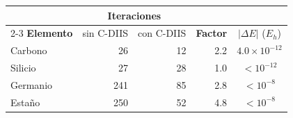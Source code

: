 \begin{tabular}{lrrrc}
    \toprule
     & \multicolumn{2}{c}{\textbf{Iteraciones}} &  &  \\
    \cmidrule(lr){2-3}
    \textbf{Elemento} & sin C-DIIS & con C-DIIS & \textbf{Factor} & $|\Delta E|$ ($E_h$) \\
    \midrule
    Carbono & 26 & 12 & 2.2 & $4.0\times10^{-12}$ \\
    Silicio & 27 & 28 & 1.0 & $<10^{-12}$ \\
    Germanio & 241 & 85 & 2.8 & $<10^{-8}$ \\
    Estaño & 250 & 52 & 4.8 & $<10^{-8}$ \\
    \bottomrule
\end{tabular}
